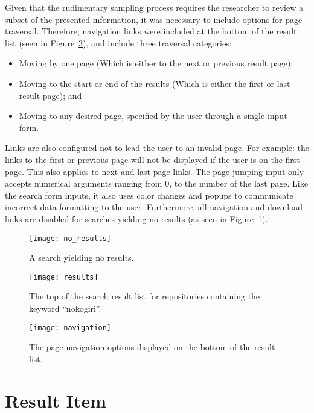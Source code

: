 Given that the rudimentary sampling process requires the researcher to review a subset of the presented information, it was necessary to include options for page traversal.
Therefore, navigation links were included at the bottom of the result list (seen in Figure~\ref{fig:7}), and include three traversal categories:
\begin{itemize}
    \item Moving by one page (Which is either to the next or previous result page);
    \item Moving to the start or end of the results (Which is either the first or last result page); and
    \item Moving to any desired page, specified by the user through a single-input form.
\end{itemize}
Links are also configured not to lead the user to an invalid page. For example: the links to the first or previous page will not be displayed if the user is on the first page. This also applies to next and last page links. The page jumping input only accepts numerical arguments ranging from 0, to the number of the last page. Like the search form inputs, it also uses color changes and popups to communicate incorrect data formatting to the user. Furthermore, all navigation and download links are disabled for searches yielding no results (as seen in Figure~\ref{fig:5}).

\newpage
\begin{figure}[ht!]
    \centering
    \texttt{[image: no\_results]}
    \caption[Empty result list]{A search yielding no results.}
    \label{fig:5}
\end{figure}

\begin{figure}[ht!]
    \centering
    \texttt{[image: results]}
    \caption[Search result list]{The top of the search result list for repositories containing the keyword ``nokogiri''.}
    \label{fig:6}
\end{figure}

\begin{figure}[ht!]
    \centering
    \texttt{[image: navigation]}
    \caption[Search page navigation options]{The page navigation options displayed on the bottom of the result list.}
    \label{fig:7}
\end{figure}

\newpage
\section{Result Item}

